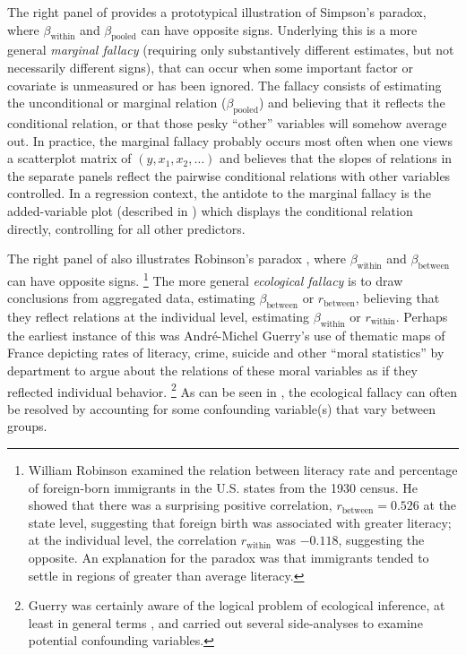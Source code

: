 The right panel of  provides a prototypical illustration of Simpson's paradox,
where $\beta_{\textrm{within}}$ and $\beta_{\textrm{pooled}}$ can have opposite signs. Underlying this is a
more general \emph{marginal fallacy} (requiring only substantively different estimates, but not necessarily
different signs), 
that can occur when some important factor or covariate is unmeasured
or has been ignored. The fallacy consists of estimating the unconditional or marginal
relation ($\beta_{\textrm{pooled}}$) and believing that it reflects the conditional relation, or that
those pesky ``other'' variables will somehow average out. In practice, the marginal fallacy probably occurs most
often when one views a scatterplot matrix of $(y, x_1, x_2, \dots)$ and believes that the slopes of
relations in the separate panels reflect the pairwise conditional relations with other variables
controlled. In a regression context, the antidote to the marginal fallacy is the added-variable
plot (described in )
which displays the conditional relation directly, controlling for all other predictors.

The right panel of  also illustrates Robinson's paradox \citep{Robinson:1950},
where $\beta_{\textrm{within}}$ and $\beta_{\textrm{between}}$ can have opposite signs.%
\footnote{
William Robinson \citeyearpar{Robinson:1950} examined the relation between literacy rate and percentage
of foreign-born immigrants in the U.S. states from the 1930 census.  
He showed that there was a surprising
positive correlation, $r_{\textrm{between}}= 0.526$ at the state level,
suggesting that foreign birth was associated with greater literacy;
at the individual level, the correlation $r_{\textrm{within}}$ was $-0.118$, suggesting the opposite.
An explanation for the paradox was that immigrants tended to settle in regions of greater than
average literacy.
}
The more general \emph{ecological fallacy} \citep{Freedman:01}
is to draw conclusions from aggregated data, estimating
$\beta_{\textrm{between}}$ or $r_{\textrm{between}}$, believing that they reflect relations
at the individual level, estimating $\beta_{\textrm{within}}$ or $r_{\textrm{within}}$.
Perhaps the earliest instance of this was Andr\'e-Michel Guerry's \citeyearpar{Guerry:1833} use of thematic maps of
France depicting rates of literacy, crime, suicide and other ``moral statistics'' by department to argue 
about the relations of these moral variables as if they reflected individual behavior.%
\footnote{
Guerry was certainly aware of the logical problem of ecological inference, at least in general terms
\citep{Friendly:07:guerry}, and carried out several side-analyses to examine potential confounding
variables.  
}
As can be seen in , the ecological fallacy can often be resolved
by accounting for some confounding variable(s) that vary between groups.

